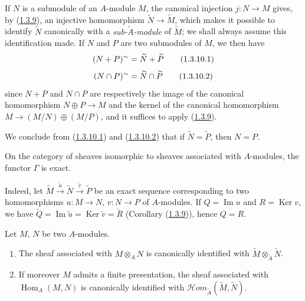 \begin{env}[1.3.10]
\label{I.1.3.10}
If $N$ is a submodule of an $A$-module $M$, the canonical injection
$j:N\to M$ gives, by (\hyperref[I.1.3.9]{1.3.9}), an injective
homomorphism $\widetilde{N}\to\widetilde{M}$, which makes it possible to
identify $\widetilde{N}$ canonically with a \emph{sub-$\widetilde{A}$-module}
of $\widetilde{M}$; we shall always assume this identification made. If $N$
and $P$ are two submodules of $M$, we then have
\begin{equation}
  (N+P)^{\sim}=\widetilde{N}+\widetilde{P}
  \tag{1.3.10.1}\label{I.1.3.10.1}
\end{equation}
\begin{equation}
  (N\cap P)^{\sim}=\widetilde{N}\cap\widetilde{P}
  \tag{1.3.10.2}\label{I.1.3.10.2}
\end{equation}
since $N+P$ and $N\cap P$ are respectively the image of the canonical
homomorphism $N\oplus P\to M$ and the kernel of the canonical homomorphism
$M\to(M/N)\oplus(M/P)$, and it suffices to apply
(\hyperref[I.1.3.9]{1.3.9}).

We conclude from (\hyperref[I.1.3.10.1]{1.3.10.1}) and
(\hyperref[I.1.3.10.2]{1.3.10.2}) that if
$\widetilde{N}=\widetilde{P}$, then $N=P$.
\end{env}

\begin{corollary}[1.3.11]
\label{I.1.3.11}
On the category of sheaves isomorphic to sheaves associated with
$A$-modules, the functor $\Gamma$ is exact.
\end{corollary}

Indeed, let
$\widetilde{M}\xrightarrow{\widetilde{u}}\widetilde{N}
\xrightarrow{\widetilde{v}}\widetilde{P}$ be an exact sequence corresponding
to two homomorphisms $u:M\to N$, $v:N\to P$ of $A$-modules. If
$Q=\operatorname{Im}u$ and $R=\operatorname{Ker}v$, we have
$\widetilde{Q}=\operatorname{Im}\widetilde{u}
=\operatorname{Ker}\widetilde{v}=\widetilde{R}$
(Corollary (\hyperref[I.1.3.9]{1.3.9})), hence $Q=R$.

\begin{corollary}[1.3.12]
\label{I.1.3.12}
Let $M$, $N$ be two $A$-modules.
\begin{enumerate}
  \item[\rm(i)] The sheaf associated with $M\otimes_A N$ is canonically
  identified with $\widetilde{M}\otimes_{\widetilde{A}}\widetilde{N}$.
  \item[\rm(ii)] If moreover $M$ admits a finite presentation, the sheaf
  associated with $\operatorname{Hom}_A(M,N)$ is canonically identified with
  $\mathscr{H}\!om_{\widetilde{A}}(\widetilde{M},\widetilde{N})$.
\end{enumerate}
\end{corollary}

